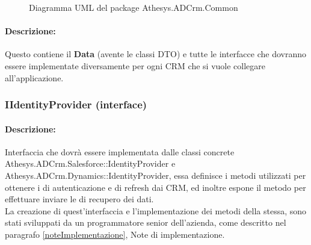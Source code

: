 	\begin{figure}[H]
		\centering
		
		\caption{Diagramma UML del package Athesys.ADCrm.Common}
		\label{fig:common}
	\end{figure}


\newpage
\paragraph{Descrizione:}
Questo  contiene il  \textbf{Data} (avente le classi \gls{DTO}) e tutte le interfacce che dovranno essere implementate diversamente per ogni CRM che si vuole collegare all'applicazione. 

\subsubsection{IIdentityProvider (interface)}

\paragraph{Descrizione:}
Interfaccia che dovrà essere implementata dalle classi concrete Athesys.ADCrm.Salesforce::IdentityProvider e\\ Athesys.ADCrm.Dynamics::IdentityProvider, essa definisce i metodi utilizzati per ottenere i  di autenticazione e di refresh dai CRM, ed inoltre espone il metodo per effettuare inviare le  di recupero dei dati.\\
La creazione di quest'interfaccia e l'implementazione dei metodi della stessa, sono stati sviluppati da un programmatore senior dell'azienda, come descritto nel paragrafo \ref{noteImplementazione}, Note di implementazione.
